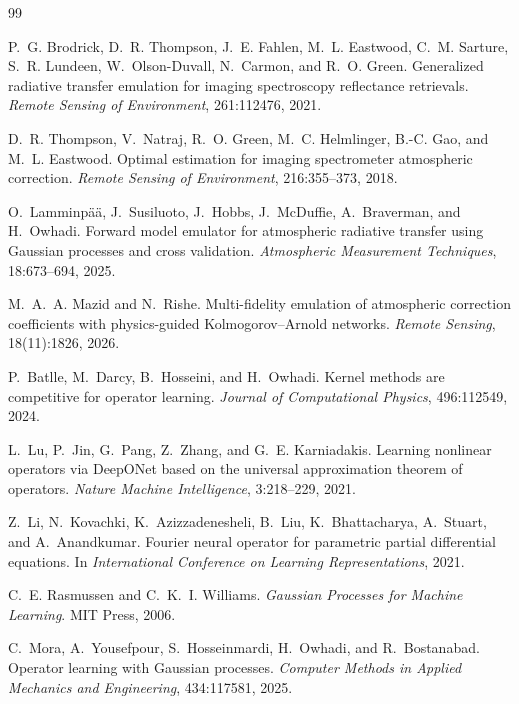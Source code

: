 \begin{thebibliography}{99}

P.~G. Brodrick, D.~R. Thompson, J.~E. Fahlen, M.~L. Eastwood, C.~M. Sarture, S.~R. Lundeen,
W.~Olson-Duvall, N.~Carmon, and R.~O. Green.
\newblock Generalized radiative transfer emulation for imaging spectroscopy reflectance
retrievals.
\newblock \emph{Remote Sensing of Environment}, 261:112476, 2021.

D.~R. Thompson, V.~Natraj, R.~O. Green, M.~C. Helmlinger, B.-C. Gao, and M.~L. Eastwood.
\newblock Optimal estimation for imaging spectrometer atmospheric correction.
\newblock \emph{Remote Sensing of Environment}, 216:355--373, 2018.

O.~Lamminp\"a\"a, J.~Susiluoto, J.~Hobbs, J.~McDuffie, A.~Braverman, and H.~Owhadi.
\newblock Forward model emulator for atmospheric radiative transfer using Gaussian processes and
cross validation.
\newblock \emph{Atmospheric Measurement Techniques}, 18:673--694, 2025.

M.~A.~A. Mazid and N.~Rishe.
\newblock Multi-fidelity emulation of atmospheric correction coefficients with physics-guided
Kolmogorov--Arnold networks.
\newblock \emph{Remote Sensing}, 18(11):1826, 2026.

P.~Batlle, M.~Darcy, B.~Hosseini, and H.~Owhadi.
\newblock Kernel methods are competitive for operator learning.
\newblock \emph{Journal of Computational Physics}, 496:112549, 2024.

L.~Lu, P.~Jin, G.~Pang, Z.~Zhang, and G.~E. Karniadakis.
\newblock Learning nonlinear operators via {DeepONet} based on the universal approximation
theorem of operators.
\newblock \emph{Nature Machine Intelligence}, 3:218--229, 2021.

Z.~Li, N.~Kovachki, K.~Azizzadenesheli, B.~Liu, K.~Bhattacharya, A.~Stuart, and
A.~Anandkumar.
\newblock Fourier neural operator for parametric partial differential equations.
\newblock In \emph{International Conference on Learning Representations}, 2021.

C.~E. Rasmussen and C.~K.~I. Williams.
\newblock \emph{Gaussian Processes for Machine Learning}.
\newblock MIT Press, 2006.

C.~Mora, A.~Yousefpour, S.~Hosseinmardi, H.~Owhadi, and R.~Bostanabad.
\newblock Operator learning with {Gaussian} processes.
\newblock \emph{Computer Methods in Applied Mechanics and Engineering}, 434:117581, 2025.


\end{thebibliography}
